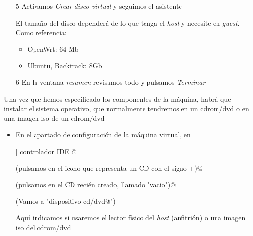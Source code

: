 \documentclass[ucs]{beamer}
\begin{document}
\begin{frame}[fragile]

\begin{enumerate}
\item[5]
Activamos \emph{Crear disco virtual} y seguimos el asistente

El tamaño del disco dependerá de lo que tenga el \emph{host} y necesite en \emph{guest}.
Como referencia:

\begin{itemize}
\item
OpenWrt: 64 Mb
\item
Ubuntu, Backtrack: 8Gb
\end{itemize}


\item[6]
En la ventana \emph{resumen} revisamos todo y pulsamos
\emph{Terminar}


\end{enumerate}


\end{frame}
\begin{frame}[fragile]
Una vez que hemos especificado los componentes
de la máquina, habrá que instalar el sistema operativo, que
normalmente tendremos en un cdrom/dvd o en una imagen iso de
un cdrom/dvd
\begin{itemize}
\item
En el apartado de configuración
de la máquina virtual, en

\begin{scriptsize}
\verb@Almacenamiento | controlador IDE @

\verb@(pulsamos en el icono que representa un CD con el signo +)@

\verb@(pulsamos en el CD recién creado, llamado "vacio")@

\verb@(Vamos a "dispositivo cd/dvd@")
\end{scriptsize}

Aquí indicamos si usaremos el lector físico del \emph{host} (anfitrión)
o una imagen iso del cdrom/dvd

\end{itemize}

\end{frame}
\end{document}
